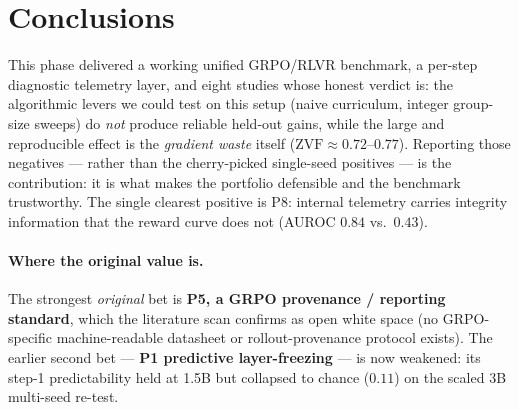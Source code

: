 \documentclass[12pt,a4paper]{report}
\newcommand{\zvf}{\mathrm{ZVF}}
\begin{document}
\section{Conclusions}
This phase delivered a working unified GRPO/RLVR benchmark, a per-step diagnostic
telemetry layer, and eight studies whose honest verdict is: the algorithmic levers we
could test on this setup (naive curriculum, integer group-size sweeps) do \emph{not}
produce reliable held-out gains, while the large and reproducible effect is the
\emph{gradient waste} itself ($\zvf \approx 0.72$--$0.77$). Reporting those negatives
--- rather than the cherry-picked single-seed positives --- is the contribution: it is
what makes the portfolio defensible and the benchmark trustworthy. The single
clearest positive is P8: internal telemetry carries integrity information that the
reward curve does not (AUROC $0.84$ vs.\ $0.43$).

\paragraph{Where the original value is.} The strongest \emph{original} bet is
\textbf{P5, a GRPO provenance / reporting standard}, which the literature scan
confirms as open white space (no GRPO-specific machine-readable datasheet or
rollout-provenance protocol exists). The earlier second bet --- \textbf{P1 predictive
layer-freezing} --- is now weakened: its step-1 predictability held at 1.5B but
collapsed to chance ($0.11$) on the scaled 3B multi-seed re-test.
\end{document}
